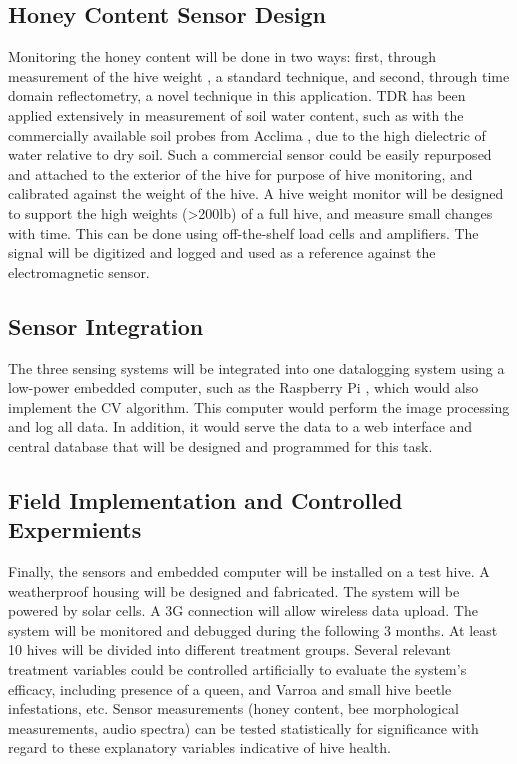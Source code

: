 \subsection{Honey Content Sensor Design}
Monitoring the honey content will be done in two ways: first, through measurement of the hive weight \cite{meikle2008within}, a standard technique, and second, through time domain reflectometry, a novel technique in this application. TDR has been applied extensively in measurement of soil water content, such as with the commercially available soil probes from Acclima \cite{blonquist2005time, schwartz2016evaluation}, due to the high dielectric of water relative to dry soil. Such a commercial sensor could be easily repurposed and attached to the exterior of the hive for purpose of hive monitoring, and calibrated against the weight of the hive. A hive weight monitor will be designed to support the high weights (>200lb) of a full hive, and measure small changes with time. This can be done using off-the-shelf load cells and amplifiers. The signal will be digitized and logged and used as a reference against the electromagnetic sensor.

\subsection{Sensor Integration}

The three sensing systems will be integrated into one datalogging system using a low-power embedded computer, such as the Raspberry Pi \cite{upton2014raspberry}, which would also implement the CV algorithm. This computer would perform the image processing and log all data. In addition, it would serve the data to a web interface and central database that will be designed and programmed for this task. 

\subsection{Field Implementation and Controlled Expermients}

Finally, the sensors and embedded computer will be installed on a test hive. A weatherproof housing will be designed and fabricated.  The system will be powered by solar cells. A 3G connection will allow wireless data upload. The system will be monitored and debugged during the following 3 months. At least 10 hives will be divided into different treatment groups. Several relevant treatment variables could be controlled
artificially to evaluate the system’s efficacy, including presence of a queen, and Varroa and small hive beetle infestations, etc. Sensor measurements (honey content, bee morphological measurements, audio spectra) can be tested statistically for significance with regard to these explanatory variables indicative of hive health.

